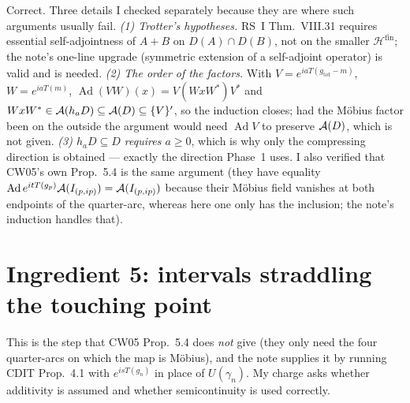 \documentclass[11pt]{article}
\newcommand{\Hil}{\mathcal H}
\newcommand{\Hfin}{\Hil^{\mathrm{fin}}}
\newcommand{\gtot}{g_{\mathrm{tot}}}
\newcommand{\Ad}{\operatorname{Ad}}
\begin{document}
\begin{verdictok}
Correct.  Three details I checked separately because they are where such arguments usually fail.
\emph{(1) Trotter's hypotheses.}  RS~I Thm.~VIII.31 requires essential self-adjointness of $A+B$ on
$D(A)\cap D(B)$, not on the smaller $\Hfin$; the note's one-line upgrade (symmetric extension of a self-adjoint
operator) is valid and is needed.  \emph{(2) The order of the factors.}  With $V=e^{ia\overline{T(\gtot-m)}}$,
$W=e^{iaT(m)}$, $\Ad(VW)(x)=V(WxW^*)V^*$ and $WxW^*\in\mathcal A(h_aD)\subseteq\mathcal A(D)\subseteq\{V\}'$, so the induction
closes; had the M\"obius factor been on the outside the argument would need $\Ad V$ to preserve $\mathcal A(D)$, which
is not given.  \emph{(3) $h_aD\subseteq D$ requires $a\ge0$}, which is why only the compressing direction is
obtained --- exactly the direction Phase~1 uses.  I also verified that CW05's own Prop.~5.4 is the same argument
(they have equality $\Ad e^{itT(g_p)}\cA(I_{(p,ip)})=\cA(I_{(p,ip)})$ because their M\"obius field vanishes at
both endpoints of the quarter-arc, whereas here one only has the inclusion; the note's induction handles that).
\end{verdictok}

\section{Ingredient 5: intervals straddling the touching point}\label{sec:straddle}

This is the step that CW05 Prop.~5.4 does \emph{not} give (they only need the four quarter-arcs on which the
map is M\"obius), and the note supplies it by running CDIT Prop.~4.1 with $e^{isT(g_n)}$ in place of
$U(\gamma_n)$.  My charge asks whether additivity is assumed and whether semicontinuity is used correctly.
\end{document}
